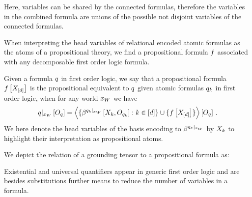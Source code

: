 Here, variables can be shared by the connected formulas, therefore the variables in the combined formula are unions of the possible not disjoint variables of the connected formulas.


When interpreting the head variables of relational encoded atomic formulas as the atoms of a propositional theory, we find a propositional formula $f$ associated with any decomposable first order logic formula.

\begin{definition}
    \label{def:propositionalEquivalent}
    Given a formula $q$ in first order logic, we say that a propositional formula $f\left[X_{[d]}\right]$ is the propositional equivalent to $q$ given atomic formulas $q_{k}$ in first order logic, when for any world $x_{W}$ we have
    \begin{align*}
        {q}|_{x_{W}} \left[O_{q}\right]
        = \left\langle 
            \{\beta^{{q_{k}}|_{x_{W}}}\left[X_{k},O_{q_{k}}\right] : k\in[d]\}
            \cup \{f\left[X_{[d]}\right]\}
        \right\rangle \left[ O_{q} \right] \, .
    \end{align*}
    We here denote the head variables of the basis encoding to $\beta^{{q_{k}}|_{x_{W}}}$ by $X_{k}$ to highlight their interpretation as propositional atoms.
\end{definition}

We depict the relation of a grounding tensor to a propositional formula as:
\begin{center}
    
\end{center}



Existential and universal quantifiers appear in generic first order logic and are besides substitutions further means to reduce the number of variables in a formula.


